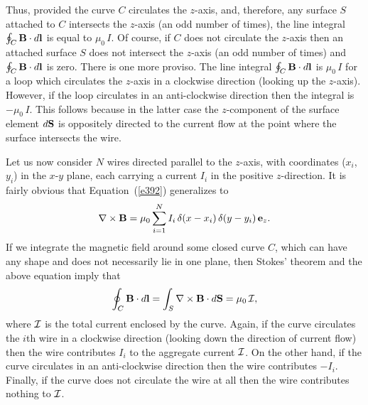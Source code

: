 Thus, provided  the curve $C$ circulates the $z$-axis, and, therefore, any surface
$S$ attached to $C$  intersects the $z$-axis (an odd number of times), the line integral
$\oint_C {\bf B}\cdot d{\bf l}$ is equal to $\mu_0\, I$.
  Of course, if $C$ does not circulate the $z$-axis then
an attached surface $S$ does not intersect the $z$-axis (an odd number of times) and 
$\oint_C {\bf B}\cdot d{\bf l}$ is zero. There is one more proviso. The line
integral $\oint_C {\bf B}\cdot d{\bf l}$ is $\mu_0\, I$ for a loop which circulates the
$z$-axis in a clockwise direction (looking up the
$z$-axis). However, if the loop circulates in an anti-clockwise
direction then the integral is $-\mu_0\, I$. This follows because in the latter case
the $z$-component of the surface element $d{\bf S}$ is oppositely directed to
the current flow at the point where the surface intersects the wire. 

Let us now consider $N$ wires directed parallel to the $z$-axis, with coordinates
($x_i$, $y_i$) in the $x$-$y$ plane, each carrying a current $I_i$ in the
positive $z$-direction. It is fairly obvious that Equation~(\ref{e392}) generalizes
to
\begin{equation}\label{e397}
\nabla\times{\bf B} = \mu_0\sum_{i=1}^N I_i\, \delta(x-x_i)\,\delta(y-y_i)
\,{\bf e}_z.
\end{equation}
If we integrate the magnetic field around some closed curve $C$, which can have any
shape and does not  necessarily lie in one plane, then Stokes' theorem and
the above equation imply that 
\begin{equation}\label{e398}
\oint_C {\bf B}\cdot d{\bf l} = \int_S \nabla\times{\bf B} \cdot d{\bf S}
= \mu_0 \,{\cal I},
\end{equation}
where ${\cal I}$ is the total current enclosed by the curve. Again, if the
curve circulates the $i$th wire  in a clockwise direction (looking down the 
direction of current flow) then the wire contributes $I_i$ 
to the aggregate current ${\cal I}$.
On the other hand, 
if the curve circulates in an anti-clockwise direction then the wire contributes
$-I_i$. Finally, if the curve does not circulate the wire at all then
the wire contributes nothing to ${\cal I}$. 

